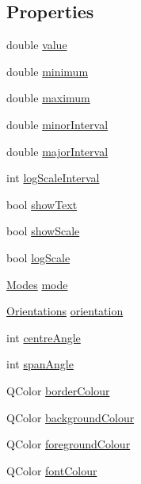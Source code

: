 \subsection*{Properties}
\begin{DoxyCompactItemize}
\item 
double \hyperlink{classQEAnalogIndicator_ad6440740a8cf86c832157ba7930b48b0}{value}
\item 
double \hyperlink{classQEAnalogIndicator_a1a1951474ce2320093474dd6d85b6c06}{minimum}
\item 
double \hyperlink{classQEAnalogIndicator_ab18f5d6ec3bac26d8bd3e200be49942a}{maximum}
\item 
double \hyperlink{classQEAnalogIndicator_a8727d8c84409a4b1c51c0c4140c65a45}{minorInterval}
\item 
double \hyperlink{classQEAnalogIndicator_a9b3fb4ab140aacdaa66b0c02df3d5a3e}{majorInterval}
\item 
int \hyperlink{classQEAnalogIndicator_a7ca36f10b9a6b449aa8acbe754d5e4c3}{logScaleInterval}
\item 
bool \hyperlink{classQEAnalogIndicator_af21560a34b89683bbf1d86733522a684}{showText}
\item 
bool \hyperlink{classQEAnalogIndicator_a5566b124bcc23b20c784490ebb5e0095}{showScale}
\item 
bool \hyperlink{classQEAnalogIndicator_ad68533fcf52035397d9fb01086ab957c}{logScale}
\item 
\hyperlink{classQEAnalogIndicator_a3f42266f1b130ee612e6187fd146a724}{Modes} \hyperlink{classQEAnalogIndicator_acfe714eddf4dbffca49c3719e006027d}{mode}
\item 
\hyperlink{classQEAnalogIndicator_a61edf87791775f2c2e203f93ab4ebfbc}{Orientations} \hyperlink{classQEAnalogIndicator_a86620e24243bd0ef449e07bdb6778720}{orientation}
\item 
int \hyperlink{classQEAnalogIndicator_a8d0b385d12db1960b0d6b9266a1027f0}{centreAngle}
\item 
int \hyperlink{classQEAnalogIndicator_a729a2313bdac9b7d6d49ecd4158d0aea}{spanAngle}
\item 
QColor \hyperlink{classQEAnalogIndicator_a001418f50a836dae0cf488dceae6ce0d}{borderColour}
\item 
QColor \hyperlink{classQEAnalogIndicator_a57c6c5f75b77abe25fc6c01803a4c03d}{backgroundColour}
\item 
QColor \hyperlink{classQEAnalogIndicator_a8a9d5b7e1181aeddf3a7022ebff74126}{foregroundColour}
\item 
QColor \hyperlink{classQEAnalogIndicator_aa469d827ef97d89741a1eacf37c10086}{fontColour}
\end{DoxyCompactItemize}


